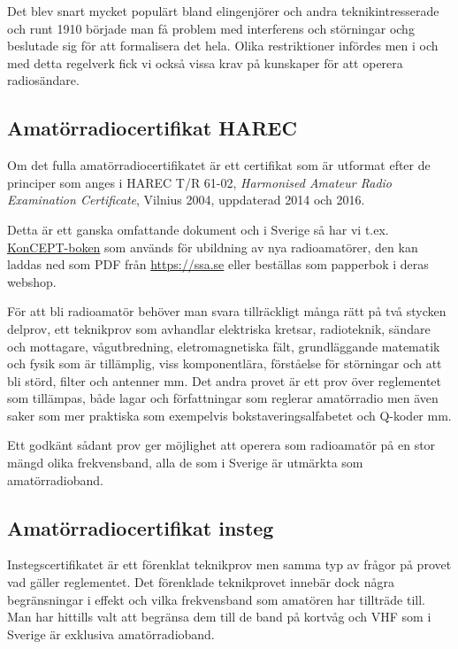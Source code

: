 Det blev snart mycket populärt bland elingenjörer och andra teknikintresserade
och runt 1910 började man få problem med interferens och störningar ochg
beslutade sig för att formalisera det hela. Olika restriktioner infördes men i
och med detta regelverk fick vi också vissa krav på kunskaper för att operera
radiosändare.

\subsection{Amatörradiocertifikat HAREC}

Om det fulla amatörradiocertifikatet är ett certifikat som är utformat efter
de principer som anges i HAREC T/R 61-02, {\it Harmonised Amateur Radio
  Examination Certificate}, Vilnius 2004, uppdaterad 2014 och 2016.

Detta är ett ganska omfattande dokument och i Sverige så har vi t.ex.
\href{https://github.com/SverigesSandareamatorer/SSA-Akademin}{KonCEPT-boken}
som används för ubildning av nya radioamatörer, den kan laddas ned som PDF
från \url{https://ssa.se} eller beställas som papperbok i deras webshop.

För att bli radioamatör behöver man svara tillräckligt många rätt på två
stycken delprov, ett teknikprov som avhandlar elektriska kretsar, radioteknik,
sändare och mottagare, vågutbredning, eletromagnetiska fält, grundläggande
matematik och fysik som är tillämplig, viss komponentlära, förståelse för
störningar och att bli störd, filter och antenner mm. Det andra provet är ett
prov över reglementet som tillämpas, både lagar och författningar som reglerar
amatörradio men även saker som mer praktiska som exempelvis
bokstaveringsalfabetet och Q-koder mm.

Ett godkänt sådant prov ger möjlighet att operera som radioamatör på en stor
mängd olika frekvensband, alla de som i Sverige är utmärkta som
amatörradioband.

\subsection{Amatörradiocertifikat insteg}
\label{sec:instegscertifikat}

Instegscertifikatet är ett förenklat teknikprov men samma typ av frågor på
provet vad gäller reglementet. Det förenklade teknikprovet innebär dock några
begränsningar i effekt och vilka frekvensband som amatören har tillträde till.
Man har hittills valt att begränsa dem till de band på kortvåg och VHF som i
Sverige är exklusiva amatörradioband.

